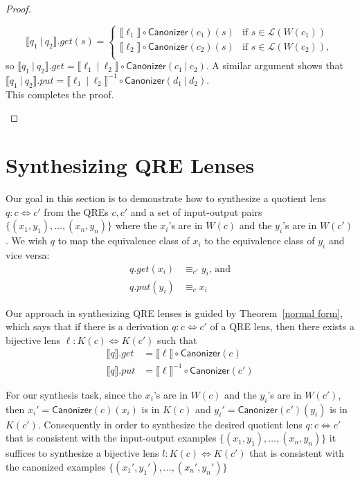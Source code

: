 \documentclass[acmsmall,review,anonymous]{acmart}
\newcommand{\kw}[1]{\ensuremath{\mathsf{#1}}}
\newcommand{\sep}{\ensuremath{\ | \ }}
\newcommand{\canonizer}{\ensuremath{\kw{Canonizer}}}
\begin{document}
\begin{proof}
\begin{enumerate}
$$
\llbracket q_1 \sep q_2 \rrbracket.get(s) =
\begin{cases}
\llbracket \ell_1 \rrbracket \circ
\canonizer(c_1) (s) & \text{if } s \in \mathcal{L}(W(c_1))\\
\llbracket \ell_2 \rrbracket \circ
\canonizer(c_2) (s) & \text{if } s \in \mathcal{L}(W(c_2)),\\
\end{cases}$$
so $\llbracket q_1 \sep q_2 \rrbracket.get = \llbracket \ell_1 \sep
\ell_2 \rrbracket \circ \canonizer(c_1 \sep c_2)$. A similar argument shows
that $\llbracket q_1 \sep q_2 \rrbracket.put = \llbracket \ell_1 \sep
\ell_2 \rrbracket^{-1} \circ \canonizer(d_1 \sep d_2)$.\\
This completes the proof.
\end{enumerate}
\end{proof}

\fi
\section{Synthesizing QRE Lenses}
\label{synth}
Our goal in this section is to demonstrate how to synthesize a quotient lens
$q: c \Leftrightarrow c'$ from the QREs $c, c'$ and a set of input-output pairs
$\{(x_1, y_1), \ldots, (x_n, y_n)\}$ where the $x_i$'s are in $W(c)$ and the
$y_i$'s are in $W(c')$. We wish $q$ to map the equivalence class of $x_i$ to the
equivalence class of $y_i$ and vice versa:
\begin{align*}
q.get(x_i) &\equiv_{c'} y_i \text{, and}\\
q.put(y_i) &\equiv_c x_i
\end{align*}

Our approach in synthesizing QRE lenses is guided by Theorem~\ref{normal
form}, which says that if there is a derivation $q :
c \Leftrightarrow c'$ of a QRE lens, then there exists a bijective lens $\ell :
K(c) \Leftrightarrow K(c')$ such that
\begin{align*}
\llbracket q \rrbracket.get &= \llbracket \ell \rrbracket\circ \canonizer(c)\\
\llbracket q \rrbracket.put &= \llbracket \ell \rrbracket^{-1} \circ
\canonizer(c')
\end{align*}

For our synthesis task, since the $x_i$'s are in $W(c)$ and the $y_i$'s are
in $W(c')$, then ${x_i}' = \canonizer(c)(x_i)$ is in $K(c)$ and ${y_i}' =
\canonizer(c')(y_i)$ is in $K(c')$. Consequently in order to synthesize the
desired quotient lens $q: c \Leftrightarrow c'$ that is consistent with the
input-output examples $\{(x_1, y_1), \ldots, (x_n, y_n)\}$ it suffices to
synthesize a bijective lens $l :
K(c) \Leftrightarrow K(c')$ that is consistent with the canonized examples
$\{({x_1}', {y_1}'), \ldots, ({x_n}', {y_n}')\}$
\end{document}
